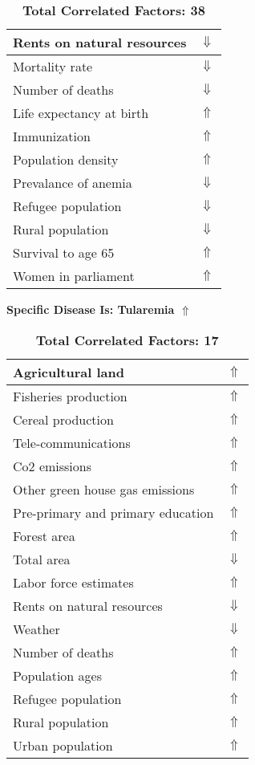 \documentclass[12pt,notitlepage,oneside]{report}
\begin{document}
\begin{table}[!htb]
\begin{tabular}{|l|l|}
Rents on natural resources & $\Downarrow$\\ \hline
Mortality rate & $\Downarrow$\\ \hline
Number of deaths & $\Downarrow$\\ \hline
Life expectancy at birth & $\Uparrow$\\ \hline
Immunization & $\Uparrow$\\ \hline
Population density & $\Uparrow$\\ \hline
Prevalance of anemia & $\Downarrow$\\ \hline
Refugee population & $\Downarrow$\\ \hline
Rural population & $\Downarrow$\\ \hline
Survival to age 65 & $\Uparrow$\\ \hline
Women in parliament & $\Uparrow$\\ \hline
\end{tabular}
\caption*{\textbf{Total Correlated Factors: 38}}
\end{table}
\clearpage
\begin{table}[!htb]
\caption{\textbf{Specific Disease Is: Tularemia $\Uparrow$}}
\centering
\label{Correlated Socio-economic Factors0}
\begin{tabular}{|l|l|}
\hline
Agricultural land & $\Uparrow$\\ \hline
Fisheries production & $\Uparrow$\\ \hline
Cereal production & $\Uparrow$\\ \hline
Tele-communications & $\Uparrow$\\ \hline
Co2 emissions & $\Uparrow$\\ \hline
Other green house gas emissions & $\Uparrow$\\ \hline
Pre-primary and primary education & $\Uparrow$\\ \hline
Forest area & $\Uparrow$\\ \hline
Total area & $\Downarrow$\\ \hline
Labor force estimates & $\Uparrow$\\ \hline
Rents on natural resources & $\Downarrow$\\ \hline
Weather & $\Downarrow$\\ \hline
Number of deaths & $\Uparrow$\\ \hline
Population ages & $\Uparrow$\\ \hline
Refugee population & $\Uparrow$\\ \hline
Rural population & $\Uparrow$\\ \hline
Urban population & $\Uparrow$\\ \hline
\end{tabular}
\caption*{\textbf{Total Correlated Factors: 17}}
\end{table}
\end{document}
